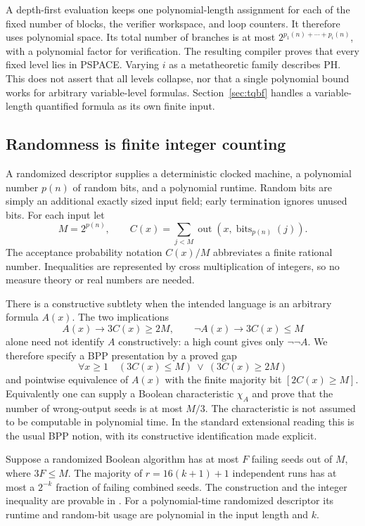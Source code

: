 A depth-first evaluation keeps one polynomial-length assignment for each
of the fixed number of blocks, the verifier workspace, and loop counters.
It therefore uses polynomial space. Its total number of branches is at
most \(2^{p_1(n)+\cdots+p_i(n)}\), with a polynomial factor for verification.
The resulting compiler proves that every fixed level lies in PSPACE.
Varying \(i\) as a metatheoretic family describes PH. This does not assert
that all levels collapse, nor that a single polynomial bound works for
arbitrary variable-level formulas. Section~\ref{sec:tqbf} handles a
variable-length quantified formula as its own finite input.

\subsection{Randomness is finite integer counting}

A randomized descriptor supplies a deterministic clocked machine, a
polynomial number \(p(n)\) of random bits, and a polynomial runtime.
Random bits are simply an additional exactly sized input field; early
termination ignores unused bits. For each input let
\[
 M=2^{p(n)},\qquad
 C(x)=\sum_{j<M}\operatorname{out}(x,\operatorname{bits}_{p(n)}(j)).
\]
The acceptance probability notation \(C(x)/M\) abbreviates a finite
rational number. Inequalities are represented by cross multiplication of
integers, so no measure theory or real numbers are needed.

There is a constructive subtlety when the intended language is an arbitrary
formula \(A(x)\). The two implications
\[
 A(x)\to 3C(x)\ge2M,\qquad
 \neg A(x)\to 3C(x)\le M
\]
alone need not identify \(A\) constructively: a high count gives only
\(\neg\neg A\). We therefore specify a BPP presentation by a proved gap
\[
 \forall x\ge1\quad
       (3C(x)\le M)\ \lor\ (3C(x)\ge2M)
\]
and pointwise equivalence of \(A(x)\) with the finite majority bit
\([2C(x)\ge M]\). Equivalently one can supply a Boolean characteristic
\(\chi_A\) and prove that the number of wrong-output seeds is at most
\(M/3\). The characteristic is not assumed to be computable in polynomial
time. In the standard extensional reading this is the usual BPP notion,
with its constructive identification made explicit.

\begin{theorem}
\label{thm:amplification}
Suppose a randomized Boolean algorithm has at most \(F\) failing seeds out
of \(M\), where \(3F\le M\). The majority of
\(r=16(k+1)+1\) independent runs has at most a \(2^{-k}\) fraction of
failing combined seeds. The construction and the integer inequality are
provable in \ipra. For a polynomial-time randomized descriptor its runtime
and random-bit usage are polynomial in the input length and \(k\).
\end{theorem}

